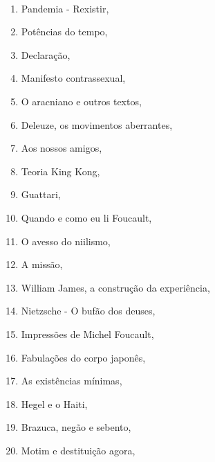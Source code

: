 \medskip

{}\\

\begin{multicols}{2}
\begin{enumerate}
\item Pandemia - Rexistir, {}
\item Potências do tempo, {}
\item Declaração, {}
\item Manifesto contrassexual, {}
\item O aracniano e outros textos, {}
\item Deleuze, os movimentos aberrantes, {}
\item Aos nossos amigos, {}
\item Teoria King Kong, {}
\item Guattari, {}
\item Quando e como eu li Foucault, {}
\item O avesso do niilismo, {}
\item A missão, {}
\item William James, a construção da experiência, {}
\item Nietzsche - O bufão dos deuses, {}
\item Impressões de Michel Foucault, {}
\item Fabulações do corpo japonês, {}
\item As existências mínimas, {}
\item Hegel e o Haiti, {}
\item Brazuca, negão e sebento, {}
\item Motim e destituição agora, {}

\end{enumerate}
\end{multicols}
